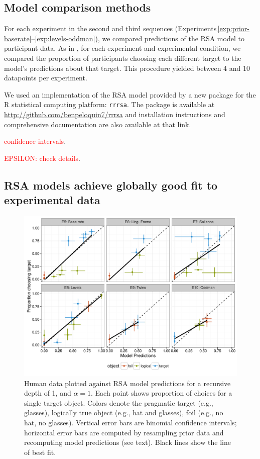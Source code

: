 \documentclass[man,noapacite]{apa2}
\newcommand{\red}[1]{\textcolor{red}{#1}}
\newcounter{Experiment}
\newcommand{\exptrefrange}[2]{Experiments\,\ref{#1}--\ref{#2}}
\begin{document}
\subsection{Model comparison methods}

For each experiment in the second and third sequences (\exptrefrange{exp:prior-baserate}{exp:levels-oddman}), we compared predictions of the RSA model to participant data. As in , for each experiment and experimental condition, we compared the proportion of participants choosing each different target to the model's predictions about that target. This procedure yielded between 4 and 10 datapoints per experiment.

We used an implementation of the RSA model provided by a new package for the R statistical computing platform: \texttt{rrrsa}. The package is available at \url{http://github.com/benpeloquin7/rrrsa} and installation instructions and comprehensive documentation are also available at that link.

\red{confidence intervals}.

\red{EPSILON: check details}.

\subsection{RSA models achieve globally good fit to experimental data}

\begin{figure}[t]
 \centering
 \includegraphics[width=6in]{../plots/model_basic.pdf}
 \caption{\label{fig:basic} Human data plotted against RSA model predictions for a recursive depth of 1, and $\alpha=1$. Each point shows proportion of choices for a single target object. Colors denote the pragmatic target (e.g., glasses), logically true object (e.g., hat and glasses), foil (e.g., no hat, no glasses). Vertical error bars are binomial confidence intervals; horizontal error bars are computed by resampling prior data and recomputing model predictions (see text). Black lines show the line of best fit.}
\end{figure}
\end{document}
